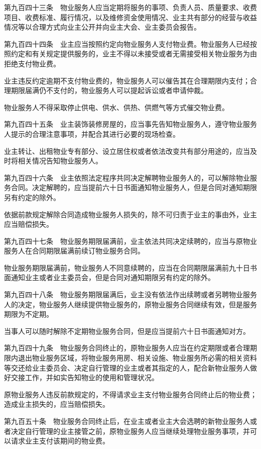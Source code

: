 \documentclass[UTF8,12pt,a4paper]{ctexbook}
\begin{document}
第九百四十三条　物业服务人应当定期将服务的事项、负责人员、质量要求、收费项目、收费标准、履行情况，以及维修资金使用情况、业主共有部分的经营与收益情况等以合理方式向业主公开并向业主大会、业主委员会报告。

第九百四十四条　业主应当按照约定向物业服务人支付物业费。物业服务人已经按照约定和有关规定提供服务的，业主不得以未接受或者无需接受相关物业服务为由拒绝支付物业费。

业主违反约定逾期不支付物业费的，物业服务人可以催告其在合理期限内支付；合理期限届满仍不支付的，物业服务人可以提起诉讼或者申请仲裁。

物业服务人不得采取停止供电、供水、供热、供燃气等方式催交物业费。

第九百四十五条　业主装饰装修房屋的，应当事先告知物业服务人，遵守物业服务人提示的合理注意事项，并配合其进行必要的现场检查。

业主转让、出租物业专有部分、设立居住权或者依法改变共有部分用途的，应当及时将相关情况告知物业服务人。

第九百四十六条　业主依照法定程序共同决定解聘物业服务人的，可以解除物业服务合同。决定解聘的，应当提前六十日书面通知物业服务人，但是合同对通知期限另有约定的除外。

依据前款规定解除合同造成物业服务人损失的，除不可归责于业主的事由外，业主应当赔偿损失。

第九百四十七条　物业服务期限届满前，业主依法共同决定续聘的，应当与原物业服务人在合同期限届满前续订物业服务合同。

物业服务期限届满前，物业服务人不同意续聘的，应当在合同期限届满前九十日书面通知业主或者业主委员会，但是合同对通知期限另有约定的除外。

第九百四十八条　物业服务期限届满后，业主没有依法作出续聘或者另聘物业服务人的决定，物业服务人继续提供物业服务的，原物业服务合同继续有效，但是服务期限为不定期。

当事人可以随时解除不定期物业服务合同，但是应当提前六十日书面通知对方。

第九百四十九条　物业服务合同终止的，原物业服务人应当在约定期限或者合理期限内退出物业服务区域，将物业服务用房、相关设施、物业服务所必需的相关资料等交还给业主委员会、决定自行管理的业主或者其指定的人，配合新物业服务人做好交接工作，并如实告知物业的使用和管理状况。

原物业服务人违反前款规定的，不得请求业主支付物业服务合同终止后的物业费；造成业主损失的，应当赔偿损失。

第九百五十条　物业服务合同终止后，在业主或者业主大会选聘的新物业服务人或者决定自行管理的业主接管之前，原物业服务人应当继续处理物业服务事项，并可以请求业主支付该期间的物业费。
\end{document}
